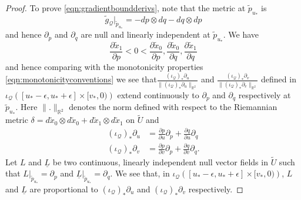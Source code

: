 \documentclass{article}
\newcommand{\Q}{\mathcal{Q}}
\newcommand{\R}{\mathbb{R}}
\begin{document}
\begin{proof}
To prove \eqref{eqn:gradientboundderivs}, note that the metric at $\tilde{p}_{u_*}$ is
$$\tilde{g}_{\Q}\vert_{\tilde{p}_{u_*}}=-dp\otimes dq-dq\otimes dp$$
and hence $\partial_p$ and $\partial_q$ are null and linearly independent at $\tilde{p}_{u_*}$. 
We have 
\begin{equation}
      \frac{\partial\tilde{x}_1}{\partial p}<0<\frac{\partial\tilde{x}_0}{\partial p},\frac{\partial\tilde{x}_0}{\partial q},\frac{\partial\tilde{x}_1}{\partial q}
\end{equation} 
and hence comparing with the monotonicity properties \eqref{eqn:monotonicityconventions} we see that$\frac{(\iota_\Q)_*\partial_u}{\lVert(\iota_\Q)_*\partial_u\rVert_{\R^2}}$ and $\frac{(\iota_\Q)_*\partial_v}{\lVert(\iota_\Q)_*\partial_v\rVert_{\R^2}}$ defined in $\iota_\Q\left([u_*-\epsilon,u_*+\epsilon]\times[v_*,0)\right)$ extend continuously to $\partial_p$ and $\partial_q$ respectively at $\tilde{p}_{u_*}$.  Here $\lVert.\rVert_{\R^2}$ denotes the norm defined with respect to the Riemannian metric $\delta=d\tilde{x}_0\otimes d\tilde{x}_0+d\tilde{x}_1\otimes d\tilde{x}_1$ on $\tilde{U}$ and 
\begin{equation}
\begin{split}
        (\iota_\Q)_*\partial_u&=\frac{\partial p}{\partial u}\partial_p+\frac{\partial q}{\partial u}\partial_q\\
     (\iota_\Q)_*\partial_v&=\frac{\partial p}{\partial v}\partial_p+\frac{\partial q}{\partial v}\partial_q.
\end{split}
\end{equation}
Let $L$ and $\underline{L}$ be two continuous, linearly independent null vector fields in $\tilde{U}$ such that $L\vert_{\tilde{p}_{u_*}}=\partial_p$ and $\underline{L}\vert_{\tilde{p}_{u_*}}=\partial_q$. We see that, in $\iota_\Q\left([u_*-\epsilon,u_*+\epsilon]\times[v_*,0)\right)$, $L$ and $\underline{L}$ are proportional to $(\iota_\Q)_*\partial_u$ and $(\iota_\Q)_*\partial_v$ respectively.


\end{proof}
\end{document}
